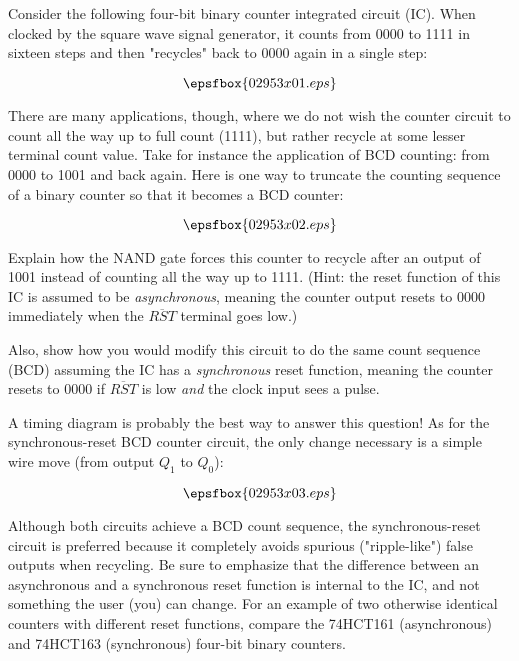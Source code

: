 

Consider the following four-bit binary counter integrated circuit (IC).  When clocked by the square wave signal generator, it counts from 0000 to 1111 in sixteen steps and then "recycles" back to 0000 again in a single step:

$$\epsfbox{02953x01.eps}$$

There are many applications, though, where we do not wish the counter circuit to count all the way up to full count (1111), but rather recycle at some lesser terminal count value.  Take for instance the application of BCD counting: from 0000 to 1001 and back again.  Here is one way to truncate the counting sequence of a binary counter so that it becomes a BCD counter:

$$\epsfbox{02953x02.eps}$$

Explain how the NAND gate forces this counter to recycle after an output of 1001 instead of counting all the way up to 1111.  (Hint: the reset function of this IC is assumed to be {\it asynchronous}, meaning the counter output resets to 0000 immediately when the $\overline{RST}$ terminal goes low.)

\vskip 10pt

Also, show how you would modify this circuit to do the same count sequence (BCD) assuming the IC has a {\it synchronous} reset function, meaning the counter resets to 0000 if $\overline{RST}$ is low {\it and} the clock input sees a pulse.







A timing diagram is probably the best way to answer this question!  As for the synchronous-reset BCD counter circuit, the only change necessary is a simple wire move (from output $Q_1$ to $Q_0$):

$$\epsfbox{02953x03.eps}$$







Although both circuits achieve a BCD count sequence, the synchronous-reset circuit is preferred because it completely avoids spurious ("ripple-like") false outputs when recycling.  Be sure to emphasize that the difference between an asynchronous and a synchronous reset function is internal to the IC, and not something the user (you) can change.  For an example of two otherwise identical counters with different reset functions, compare the 74HCT161 (asynchronous) and 74HCT163 (synchronous) four-bit binary counters.




